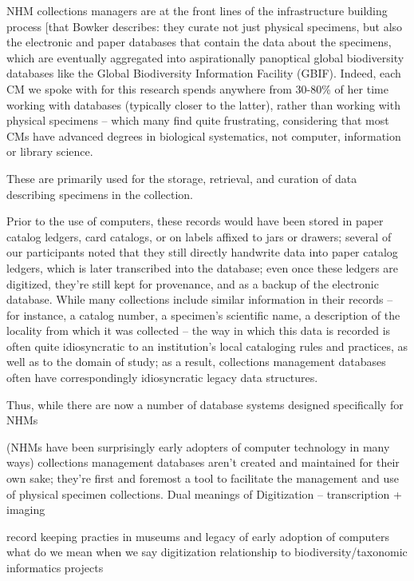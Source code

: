 NHM collections managers are at the front lines of the infrastructure building process [that Bowker describes: they curate not just physical specimens, but also the electronic and paper databases that contain the data about the specimens, which are eventually aggregated into aspirationally panoptical global biodiversity databases like the Global Biodiversity Information Facility (GBIF).  Indeed, each CM we spoke with for this research spends anywhere from 30-80\% of her time working with databases (typically closer to the latter), rather than working with physical specimens – which many find quite frustrating, considering that most CMs have advanced degrees in biological systematics, not computer, information or library science.



These are primarily used for the storage, retrieval, and curation of data describing specimens in the collection.

Prior to the use of computers, these records would have been stored in paper catalog ledgers, card catalogs, or on labels affixed to jars or drawers; several of our participants noted that they still directly handwrite data into paper catalog ledgers, which is later transcribed into the database; even once these ledgers are digitized, they’re still kept for provenance, and as a backup of the electronic database. While many collections include similar information in their records – for instance, a catalog number, a specimen’s scientific name, a description of the locality from which it was collected – the way in which this data is recorded is often quite idiosyncratic to an institution’s local cataloging rules and practices, as well as to the domain of study; as a result, collections management databases often have correspondingly idiosyncratic legacy data structures.

Thus, while there are now a number of database systems designed specifically for NHMs

(NHMs have been surprisingly early adopters of computer technology in many ways)
collections management databases aren’t created and maintained for their own sake; they’re first and foremost a tool to facilitate the management and use of physical specimen collections. 
Dual meanings of Digitization – transcription + imaging


record keeping practies in museums and legacy of early adoption of computers
what do we mean when we say digitization
relationship to biodiversity/taxonomic informatics projects

